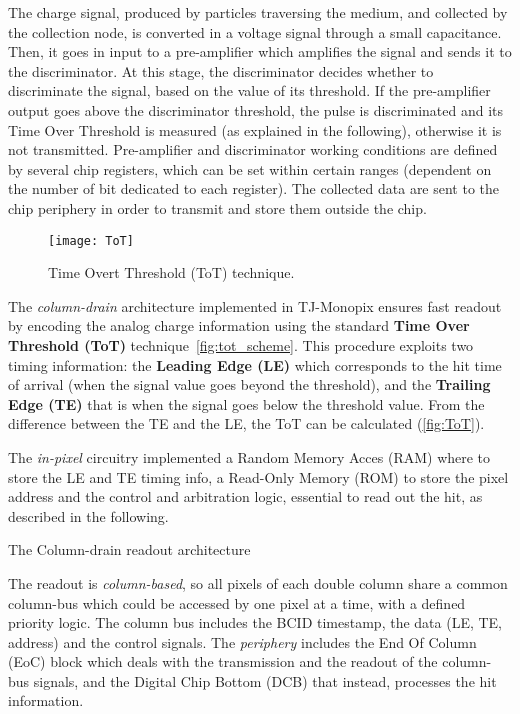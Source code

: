The charge signal, produced by particles traversing the medium, and collected by the collection node, is converted in a voltage signal through a small capacitance. Then, it goes in input to a pre-amplifier which amplifies the signal and sends it to the discriminator. At this stage, the discriminator decides whether to discriminate the signal, based on the value of its threshold. If the pre-amplifier output goes above the discriminator threshold, the pulse is discriminated and its Time Over Threshold is measured (as explained in the following), otherwise it is not transmitted. 
Pre-amplifier and discriminator working conditions are defined by several chip registers, which can be set within certain ranges (dependent on the number of bit dedicated to each register). The collected data are sent to the chip periphery in order to transmit and store them outside the chip.\\

\begin{figure}[h!]
\centering
\texttt{[image: ToT]}
\caption{Time Overt Threshold (ToT) technique.}
\label{fig:tot_scheme}
\end{figure}


The \textit{column-drain} architecture implemented in TJ-Monopix ensures fast readout by encoding the analog charge information using the standard \textbf{Time Over Threshold (ToT)} technique~\autoref{fig:tot_scheme}. This procedure exploits two timing information: the \textbf{Leading Edge (LE)} which corresponds to the hit time of arrival (when the signal value goes beyond the threshold), and the \textbf{Trailing Edge (TE)} that is when the signal goes below the threshold value. From the difference between the TE and the LE, the ToT can be calculated (\autoref{fig:ToT}).

The \textit{in-pixel} circuitry implemented a Random Memory Acces (RAM) where to store the LE and TE timing info, a Read-Only Memory (ROM) to store the pixel address and the control and arbitration logic, essential to read out the hit, as described in the following.

\begin{description}
\item[The Column-drain readout architecture]
\end{description}
 
The readout is \textit{column-based}, so all pixels of each double column share a common column-bus which could be accessed by one pixel at a time, with a defined priority logic. The column bus includes the BCID timestamp, the data (LE, TE, address) and the control signals.
The \textit{periphery} includes the End Of Column (EoC) block which deals with the transmission and the readout of the column-bus signals, and the Digital Chip Bottom (DCB) that instead, processes the hit information. 

